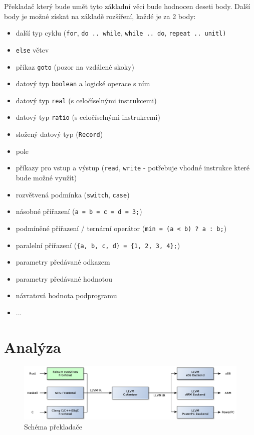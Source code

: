 \documentclass[12pt,a4paper]{article}
\begin{document}
\noindent
Překladač který bude umět tyto základní věci bude hodnocen deseti body. Další body je možné získat na základě rozšíření, každé je za 2 body:

\begin{itemize}
    \item další typ cyklu (\texttt{for}, \texttt{do .. while}, \texttt{while .. do}, \texttt{repeat .. unitl)}
    \item \texttt{else} větev
    \item příkaz \texttt{goto} (pozor na vzdálené skoky)
    \item datový typ \texttt{boolean} a logické operace s ním
    \item datový typ \texttt{real} (s celočíselnými instrukcemi)
    \item datový typ \texttt{ratio} (s celočíselnými instrukcemi)
    \item složený datový typ (\texttt{Record})
    \item pole
    \item příkazy pro vstup a výstup (\texttt{read}, \texttt{write} - potřebuje vhodné instrukce které bude možné využít)
    \item rozvětvená podmínka (\texttt{switch}, \texttt{case})
    \item násobné přiřazení (\texttt{a = b = c = d = 3;})
    \item podmíněné přiřazení / ternární operátor (\texttt{min = (a < b) ? a : b;})
    \item paralelní přiřazení (\texttt{\{a, b, c, d\} = \{1, 2, 3, 4\};})
    \item parametry předávané odkazem
    \item parametry předávané hodnotou
    \item návratová hodnota podprogramu
    \item ...
\end{itemize}


\section{Analýza}

\begin{figure}
\centering
\includegraphics[width=1\textwidth]{compiler-schema.png}
\caption{Schéma překladače}
\label{img:compiler-schema}
\end{figure}
\end{document}
